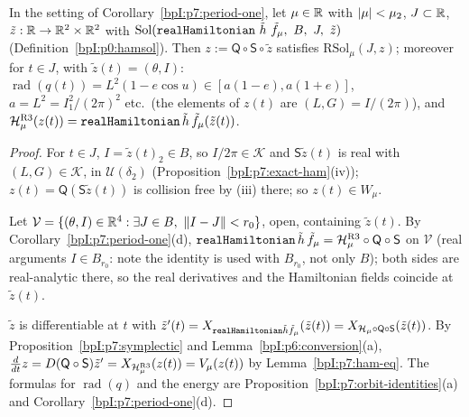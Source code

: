 \begin{proposition}\label{bpI:p7:transfer}
In the setting of Corollary~\ref{bpI:p7:period-one}, let $\mu\in\mathbb{R}$ with $\lvert \mu\rvert<\mu_2$, $J\subset\mathbb{R}$, $\tilde z:\mathbb{R}\to\mathbb{R}^2\times\mathbb{R}^2$ with $\mathrm{Sol}(\Lean{realHamiltonian}\ \tilde h\ \tilde f_\mu,\ B,\ J,\ \tilde z)$ (Definition~\ref{bpI:p0:hamsol}). Then $z:=\mathsf Q\circ\mathsf S\circ\tilde z$ satisfies $\mathrm{RSol}_\mu(J,z)$; moreover for $t\in J$, with $\tilde z(t)=(\theta,I)$:
$\operatorname{rad}(q(t))=L^2(1-e\cos u)\in[a(1-e),a(1+e)]$, $a=L^2=I_1^2/(2\pi)^2$ etc.\ (the elements of $z(t)$ are $(L,G)=I/(2\pi)$), and $\mathcal H^{\rm R3}_\mu(z(t))=\texttt{realHamiltonian}\,\tilde h\,\tilde f_\mu(\tilde z(t))$.
\end{proposition}
\begin{proof}
\label{stepI:p7:tr-cf} For $t\in J$, $I=\tilde z(t)_2\in B$, so $I/2\pi\in\mathcal K$ and $\mathsf S\tilde z(t)$ is real with $(L,G)\in\mathcal K$, in $\mathcal U(\delta_2)$ (Proposition~\ref{bpI:p7:exact-ham}(iv)); $z(t)=\mathsf Q(\mathsf S\tilde z(t))$ is collision free by (iii) there; so $z(t)\in W_\mu$.

\label{stepI:p7:tr-open} Let $\mathcal V=\{(\theta,I)\in\mathbb{R}^4:\exists J\in B,\ \lVert I-J\rVert<r_0\}$, open, containing $\tilde z(t)$. By Corollary~\ref{bpI:p7:period-one}(d), $\texttt{realHamiltonian}\,\tilde h\,\tilde f_\mu=\mathcal H^{\rm R3}_\mu\circ\mathsf Q\circ\mathsf S$ on $\mathcal V$ (real arguments $I\in B_{r_0}$: note the identity is used with $B_{r_0}$, not only $B$); both sides are real-analytic there, so the real derivatives and the Hamiltonian fields coincide at $\tilde z(t)$.

\label{stepI:p7:tr-chain} $\tilde z$ is differentiable at $t$ with $\tilde z'(t)=X_{\texttt{realHamiltonian}\tilde h\tilde f_\mu}(\tilde z(t))=X_{\mathcal H_\mu\circ\mathsf Q\circ\mathsf S}(\tilde z(t))$. By Proposition~\ref{bpI:p7:symplectic} and Lemma~\ref{bpI:p6:conversion}(a), $\frac d{dt}z=D(\mathsf Q\circ\mathsf S)\tilde z'=X_{\mathcal H^{\rm R3}_\mu}(z(t))=V_\mu(z(t))$ by Lemma~\ref{bpI:p7:ham-eq}. The formulas for $\operatorname{rad}(q)$ and the energy are Proposition~\ref{bpI:p7:orbit-identities}(a) and Corollary~\ref{bpI:p7:period-one}(d).
\end{proof}

